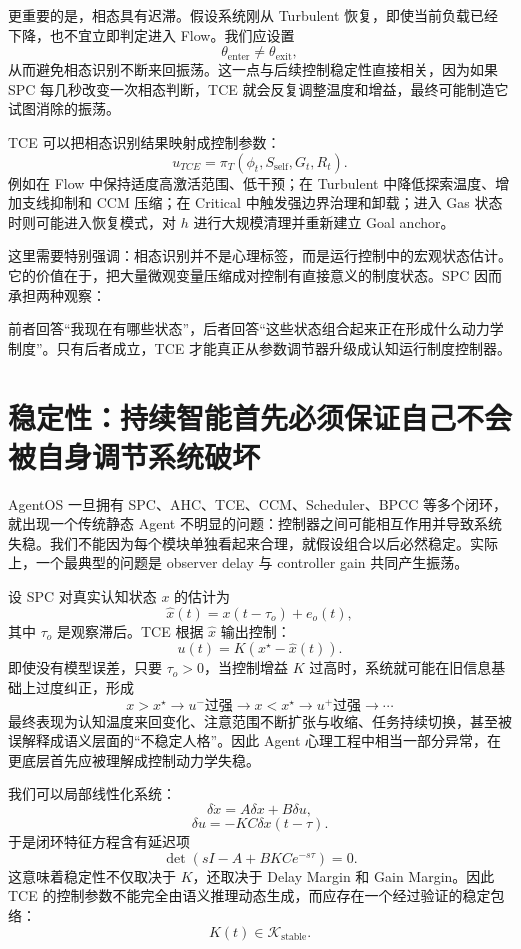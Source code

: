 更重要的是，相态具有迟滞。假设系统刚从 Turbulent 恢复，即使当前负载已经下降，也不宜立即判定进入 Flow。我们应设置
\[
\theta_{\mathrm{enter}}
\neq
\theta_{\mathrm{exit}},
\]
从而避免相态识别不断来回振荡。这一点与后续控制稳定性直接相关，因为如果 SPC 每几秒改变一次相态判断，TCE 就会反复调整温度和增益，最终可能制造它试图消除的振荡。

TCE 可以把相态识别结果映射成控制参数：
\[
u_{TCE}
=
\pi_T
\left(
\phi_t,
S_{\mathrm{self}},
G_t,
R_t
\right).
\]
例如在 Flow 中保持适度高激活范围、低干预；在 Turbulent 中降低探索温度、增加支线抑制和 CCM 压缩；在 Critical 中触发强边界治理和卸载；进入 Gas 状态时则可能进入恢复模式，对 $h$ 进行大规模清理并重新建立 Goal anchor。

这里需要特别强调：相态识别并不是心理标签，而是运行控制中的宏观状态估计。它的价值在于，把大量微观变量压缩成对控制有直接意义的制度状态。SPC 因而承担两种观察：
\begin{statementbox}
\centering
{}
\end{statementbox}
前者回答``我现在有哪些状态''，后者回答``这些状态组合起来正在形成什么动力学制度''。只有后者成立，TCE 才能真正从参数调节器升级成认知运行制度控制器。

\section{稳定性：持续智能首先必须保证自己不会被自身调节系统破坏}

AgentOS 一旦拥有 SPC、AHC、TCE、CCM、Scheduler、BPCC 等多个闭环，就出现一个传统静态 Agent 不明显的问题：控制器之间可能相互作用并导致系统失稳。我们不能因为每个模块单独看起来合理，就假设组合以后必然稳定。实际上，一个最典型的问题是 observer delay 与 controller gain 共同产生振荡。

设 SPC 对真实认知状态 $x$ 的估计为
\[
\hat{x}(t)
=
x(t-\tau_o)+e_o(t),
\]
其中 $\tau_o$ 是观察滞后。TCE 根据 $\hat x$ 输出控制：
\[
u(t)
=
K
\left(
x^\star-\hat{x}(t)
\right).
\]
即使没有模型误差，只要 $\tau_o>0$，当控制增益 $K$ 过高时，系统就可能在旧信息基础上过度纠正，形成
\[
x>x^\star
\rightarrow
u^- \text{过强}
\rightarrow
x<x^\star
\rightarrow
u^+ \text{过强}
\rightarrow\cdots
\]
最终表现为认知温度来回变化、注意范围不断扩张与收缩、任务持续切换，甚至被误解释成语义层面的``不稳定人格''。因此 Agent 心理工程中相当一部分异常，在更底层首先应被理解成控制动力学失稳。

我们可以局部线性化系统：
\[
\delta\dot{x}
=
A\delta x
+
B\delta u,
\]
\[
\delta u
=
-KC\delta x(t-\tau).
\]
于是闭环特征方程含有延迟项
\[
\det
\left(
sI-A+BKC e^{-s\tau}
\right)=0.
\]
这意味着稳定性不仅取决于 $K$，还取决于 Delay Margin 和 Gain Margin。因此 TCE 的控制参数不能完全由语义推理动态生成，而应存在一个经过验证的稳定包络：
\[
K(t)\in\mathcal K_{\mathrm{stable}}.
\]

